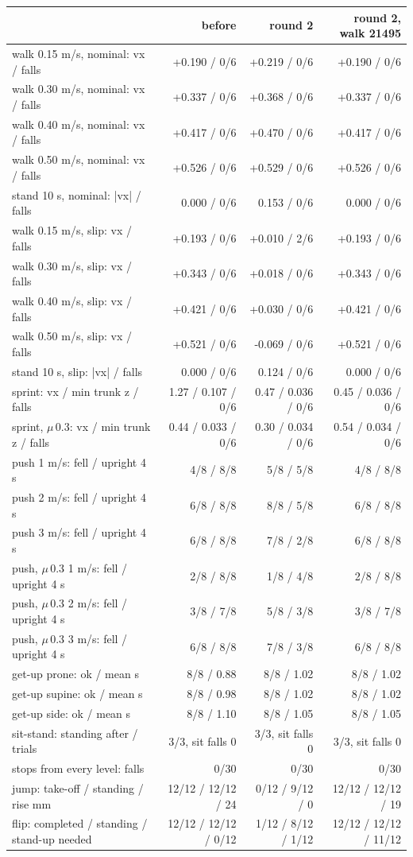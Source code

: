 \begin{tabular}{lrrr}\toprule
 & before & round 2 & round 2, walk 21495 \\\midrule
walk 0.15 m/s, nominal: vx / falls & +0.190 / 0/6 & +0.219 / 0/6 & +0.190 / 0/6 \\
walk 0.30 m/s, nominal: vx / falls & +0.337 / 0/6 & +0.368 / 0/6 & +0.337 / 0/6 \\
walk 0.40 m/s, nominal: vx / falls & +0.417 / 0/6 & +0.470 / 0/6 & +0.417 / 0/6 \\
walk 0.50 m/s, nominal: vx / falls & +0.526 / 0/6 & +0.529 / 0/6 & +0.526 / 0/6 \\
stand 10 s, nominal: |vx| / falls & 0.000 / 0/6 & 0.153 / 0/6 & 0.000 / 0/6 \\
walk 0.15 m/s, slip: vx / falls & +0.193 / 0/6 & +0.010 / 2/6 & +0.193 / 0/6 \\
walk 0.30 m/s, slip: vx / falls & +0.343 / 0/6 & +0.018 / 0/6 & +0.343 / 0/6 \\
walk 0.40 m/s, slip: vx / falls & +0.421 / 0/6 & +0.030 / 0/6 & +0.421 / 0/6 \\
walk 0.50 m/s, slip: vx / falls & +0.521 / 0/6 & -0.069 / 0/6 & +0.521 / 0/6 \\
stand 10 s, slip: |vx| / falls & 0.000 / 0/6 & 0.124 / 0/6 & 0.000 / 0/6 \\
sprint: vx / min trunk z / falls & 1.27 / 0.107 / 0/6 & 0.47 / 0.036 / 0/6 & 0.45 / 0.036 / 0/6 \\
sprint, $\mu$\,0.3: vx / min trunk z / falls & 0.44 / 0.033 / 0/6 & 0.30 / 0.034 / 0/6 & 0.54 / 0.034 / 0/6 \\
push 1 m/s: fell / upright 4 s & 4/8 / 8/8 & 5/8 / 5/8 & 4/8 / 8/8 \\
push 2 m/s: fell / upright 4 s & 6/8 / 8/8 & 8/8 / 5/8 & 6/8 / 8/8 \\
push 3 m/s: fell / upright 4 s & 6/8 / 8/8 & 7/8 / 2/8 & 6/8 / 8/8 \\
push, $\mu$\,0.3 1 m/s: fell / upright 4 s & 2/8 / 8/8 & 1/8 / 4/8 & 2/8 / 8/8 \\
push, $\mu$\,0.3 2 m/s: fell / upright 4 s & 3/8 / 7/8 & 5/8 / 3/8 & 3/8 / 7/8 \\
push, $\mu$\,0.3 3 m/s: fell / upright 4 s & 6/8 / 8/8 & 7/8 / 3/8 & 6/8 / 8/8 \\
get-up prone: ok / mean s & 8/8 / 0.88 & 8/8 / 1.02 & 8/8 / 1.02 \\
get-up supine: ok / mean s & 8/8 / 0.98 & 8/8 / 1.02 & 8/8 / 1.02 \\
get-up side: ok / mean s & 8/8 / 1.10 & 8/8 / 1.05 & 8/8 / 1.05 \\
sit-stand: standing after / trials & 3/3, sit falls 0 & 3/3, sit falls 0 & 3/3, sit falls 0 \\
stops from every level: falls & 0/30 & 0/30 & 0/30 \\
jump: take-off / standing / rise mm & 12/12 / 12/12 / 24 & 0/12 / 9/12 / 0 & 12/12 / 12/12 / 19 \\
flip: completed / standing / stand-up needed & 12/12 / 12/12 / 0/12 & 1/12 / 8/12 / 1/12 & 12/12 / 12/12 / 11/12 \\
\bottomrule\end{tabular}
